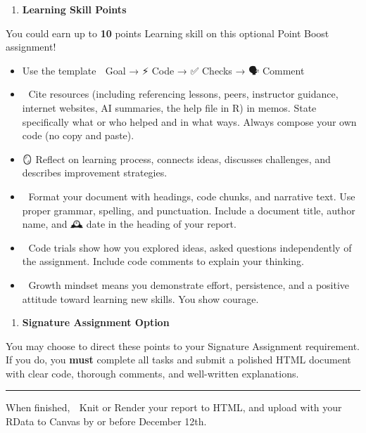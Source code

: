 \documentclass[
  12pt,
]{scrreprt}
\providecommand{\tightlist}{%
  \setlength{\itemsep}{0pt}\setlength{\parskip}{0pt}}
\begin{document}
\begin{enumerate}
\def\labelenumi{\arabic{enumi}.}
\setcounter{enumi}{1}
\tightlist
\item
  \textbf{Learning Skill Points}
\end{enumerate}

You could earn up to \textbf{10} points Learning skill on this optional Point Boost assignment!

\begin{itemize}
\item
  Use the template 🎯 Goal → ⚡ Code → ✅ Checks → 🗣 Comment
\item
  👀 Cite resources (including referencing lessons, peers, instructor guidance, internet websites, AI summaries, the help file in R) in memos. State specifically what or who helped and in what ways. Always compose your own code (no copy and paste).
\item
  🪞 Reflect on learning process, connects ideas, discusses challenges, and describes improvement strategies.
\item
  📝 Format your document with headings, code chunks, and narrative text. Use proper grammar, spelling, and punctuation. Include a document title, author name, and 🕰 date in the heading of your report.
\item
  🚀 Code trials show how you explored ideas, asked questions independently of the assignment. Include code comments to explain your thinking.
\item
  🧠 Growth mindset means you demonstrate effort, persistence, and a positive attitude toward learning new skills. You show courage.
\end{itemize}

\begin{enumerate}
\def\labelenumi{\arabic{enumi}.}
\setcounter{enumi}{2}
\tightlist
\item
  \textbf{Signature Assignment Option}
\end{enumerate}

You may choose to direct these points to your Signature Assignment requirement. If you do, you \textbf{must} complete all tasks and submit a polished HTML document with clear code, thorough comments, and well-written explanations.

\begin{center}\rule{0.5\linewidth}{0.5pt}\end{center}

When finished, 🧶 Knit or Render your report to HTML, and upload with your RData to Canvas by or before December 12th.
\end{document}
